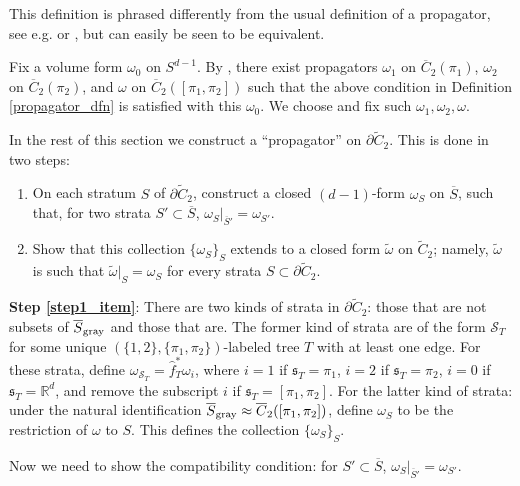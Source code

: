 \documentclass[11pt]{article}
\theoremstyle{definition}
\theoremstyle{remark}
\def\wt#1{\widetilde{#1}}
\def\ov#1{\overline{#1}}
\def\sgray{{\textnormal{gray}}}
\def\R{\mathbb{R}}
\def\fs{\mathfrak{s}}
\def\cS{\mathcal{S}}
\begin{document}
This definition is phrased differently from the usual definition of a propagator, see e.g. \cite[Definition 3.9]{Lescop} or \cite[Lemma 2.12]{WatanabeAddendum}, but can easily be seen to be equivalent. 

Fix a volume form $\omega_0$ on $S^{d-1}$. 
By \cite[Lemma 2.12]{WatanabeAddendum}, there exist propagators $\omega_1$ on $\ov{C}_2(\pi_1)$, $\omega_2$ on $\ov{C}_2(\pi_2)$, and $\omega$ on $\ov{C}_2([\pi_1,\pi_2])$ such that the above condition in Definition \ref{propagator_dfn} is satisfied with this $\omega_0$. We choose and fix such $\omega_1,\omega_2,\omega$. 

In the rest of this section we construct a ``propagator'' on $\partial\wt{C}_2$. 
This is done in two steps: 
\begin{enumerate}
\item \label{step1_item} On each stratum $S$ of $\partial\wt{C}_2$, construct a closed $(d-1)$-form $\omega_S$ on $\ov{S}$, such that, for two strata $S'\subset\ov{S}$, $\omega_S|_{\ov{S}'}=\omega_{S'}$. 
\item \label{step2_item} Show that this collection $\{\omega_S\}_S$ extends to a closed form $\wt\omega$ on $\wt{C}_2$; namely, $\wt\omega$ is such that $\wt\omega|_{S}=\omega_S$ for every strata $S\subset\partial\wt{C}_2$. 
\end{enumerate}

{\bf Step \ref{step1_item}}: 
There are two kinds of strata in $\partial\wt{C}_2$: those that are not subsets of $\ov{S}_{\sgray}$ and those that are. 
The former kind of strata are of the form $\cS_T$ for some unique $(\{1,2\},\{\pi_1,\pi_2\})$-labeled tree $T$ with at least one edge. 
For these strata, define $\omega_{\cS_T}=\hat{f}_T^*\omega_i$, where $i=1$ if $\fs_T=\pi_1$, $i=2$ if $\fs_T=\pi_2$, $i=0$ if $\fs_T=\R^d$, and remove the subscript $i$ if $\fs_T=[\pi_1,\pi_2]$. 
For the latter kind of strata: under the natural identification $\ov{S}_\sgray\approx\ov{C}_2([\pi_1,\pi_2])$, define $\omega_S$ to be the restriction of $\omega$ to $S$. 
This defines the collection $\{\omega_S\}_{S}$.

Now we need to show the compatibility condition:
for $S'\subset\ov{S}$, $\omega_S|_{\ov{S}'}=\omega_{S'}$. 
\end{document}
